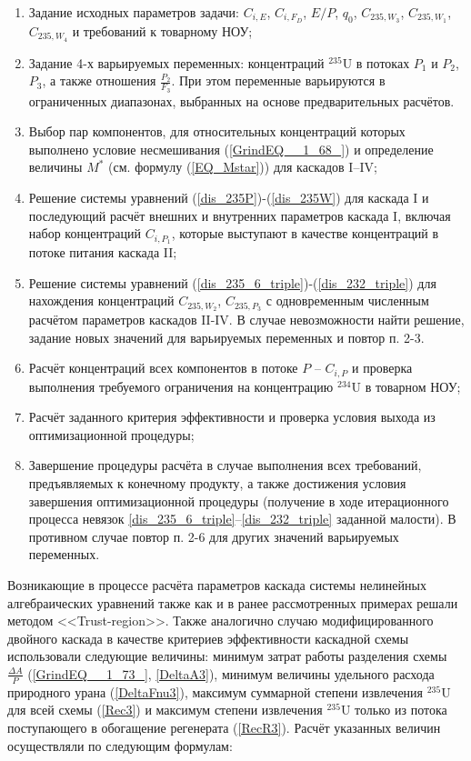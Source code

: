 \begin{enumerate}
    \item Задание исходных параметров задачи: $C_{i,E}$, $C_{i,F_D}$, $E/P$, $q_0$, $C_{235,{W_3}}$, $C_{235,{W_1}}$, $C_{235,{W_4}}$ и требований к товарному НОУ;
    \item Задание 4-х варьируемых переменных: концентраций $^{235}$U в потоках $P_1$ и $P_2$, $P_3$, а также отношения $\frac{P_{2}}{F_3}$. При этом переменные варьируются в ограниченных диапазонах, выбранных на основе предварительных расчётов. 
    \item Выбор пар компонентов, для относительных концентраций которых выполнено условие несмешивания (\ref{GrindEQ__1_68_}) и определение величины $M^{*}$ (см. формулу (\ref{EQ_Mstar})) для каскадов I--IV;
    \item Решение системы уравнений (\ref{dis_235P})-(\ref{dis_235W}) для каскада I и последующий расчёт внешних и внутренних параметров каскада I, включая набор концентраций $C_{i,{P_1}}$, которые выступают в качестве концентраций в потоке питания каскада II;
    \item Решение системы уравнений (\ref{dis_235_6_triple})-(\ref{dis_232_triple}) для нахождения концентраций $C_{235,{W_2}}$, $C_{235,{P_3}}$ с одновременным численным расчётом параметров каскадов II-IV. В случае невозможности найти решение, задание новых значений для варьируемых переменных и повтор п. 2-3.
    \item Расчёт концентраций всех компонентов в потоке $P$ -- $C_{i, P}$ и проверка выполнения требуемого ограничения на концентрацию $^{234}$U в товарном НОУ;
    \item Расчёт заданного критерия эффективности и проверка условия выхода из оптимизационной процедуры;
    \item Завершение процедуры расчёта в случае выполнения всех требований, предъявляемых к конечному продукту, а также достижения условия завершения оптимизационной процедуры (получение в ходе итерационного процесса невязок \ref{dis_235_6_triple}--\ref{dis_232_triple} заданной малости). В противном случае повтор п. 2-6 для других значений варьируемых переменных.
\end{enumerate}

Возникающие в процессе расчёта параметров каскада системы нелинейных алгебраических уравнений также как и в ранее рассмотренных примерах решали методом <<Trust-region>>. Также аналогично случаю модифицированного двойного каскада в качестве критериев эффективности каскадной схемы использовали следующие величины: минимум затрат работы разделения схемы $\frac{\Delta A}{P}$ (\ref{GrindEQ__1_73_}, \ref{DeltaA3}), минимум величины удельного расхода природного урана (\ref{DeltaFnu3}), максимум суммарной степени извлечения $^{235}$U для всей схемы (\ref{Rec3}) и максимум степени извлечения $^{235}$U только из потока поступающего в обогащение регенерата (\ref{RecR3}). Расчёт указанных величин осуществляли по следующим формулам:

